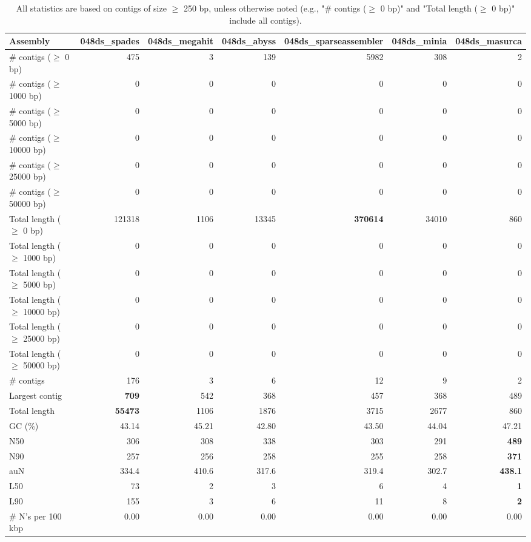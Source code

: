 \documentclass[12pt,a4paper]{article}
\begin{document}
\begin{table}[ht]
\begin{center}
\caption{All statistics are based on contigs of size $\geq$ 250 bp, unless otherwise noted (e.g., "\# contigs ($\geq$ 0 bp)" and "Total length ($\geq$ 0 bp)" include all contigs).}
\begin{tabular}{|l*{6}{|r}|}
\hline
Assembly & 048ds\_spades & 048ds\_megahit & 048ds\_abyss & 048ds\_sparseassembler & 048ds\_minia & 048ds\_masurca \\ \hline
\# contigs ($\geq$ 0 bp) & 475 & 3 & 139 & 5982 & 308 & 2 \\ \hline
\# contigs ($\geq$ 1000 bp) & 0 & 0 & 0 & 0 & 0 & 0 \\ \hline
\# contigs ($\geq$ 5000 bp) & 0 & 0 & 0 & 0 & 0 & 0 \\ \hline
\# contigs ($\geq$ 10000 bp) & 0 & 0 & 0 & 0 & 0 & 0 \\ \hline
\# contigs ($\geq$ 25000 bp) & 0 & 0 & 0 & 0 & 0 & 0 \\ \hline
\# contigs ($\geq$ 50000 bp) & 0 & 0 & 0 & 0 & 0 & 0 \\ \hline
Total length ($\geq$ 0 bp) & 121318 & 1106 & 13345 & {\bf 370614} & 34010 & 860 \\ \hline
Total length ($\geq$ 1000 bp) & 0 & 0 & 0 & 0 & 0 & 0 \\ \hline
Total length ($\geq$ 5000 bp) & 0 & 0 & 0 & 0 & 0 & 0 \\ \hline
Total length ($\geq$ 10000 bp) & 0 & 0 & 0 & 0 & 0 & 0 \\ \hline
Total length ($\geq$ 25000 bp) & 0 & 0 & 0 & 0 & 0 & 0 \\ \hline
Total length ($\geq$ 50000 bp) & 0 & 0 & 0 & 0 & 0 & 0 \\ \hline
\# contigs & 176 & 3 & 6 & 12 & 9 & 2 \\ \hline
Largest contig & {\bf 709} & 542 & 368 & 457 & 368 & 489 \\ \hline
Total length & {\bf 55473} & 1106 & 1876 & 3715 & 2677 & 860 \\ \hline
GC (\%) & 43.14 & 45.21 & 42.80 & 43.50 & 44.04 & 47.21 \\ \hline
N50 & 306 & 308 & 338 & 303 & 291 & {\bf 489} \\ \hline
N90 & 257 & 256 & 258 & 255 & 258 & {\bf 371} \\ \hline
auN & 334.4 & 410.6 & 317.6 & 319.4 & 302.7 & {\bf 438.1} \\ \hline
L50 & 73 & 2 & 3 & 6 & 4 & {\bf 1} \\ \hline
L90 & 155 & 3 & 6 & 11 & 8 & {\bf 2} \\ \hline
\# N's per 100 kbp & 0.00 & 0.00 & 0.00 & 0.00 & 0.00 & 0.00 \\ \hline
\end{tabular}
\end{center}
\end{table}
\end{document}

